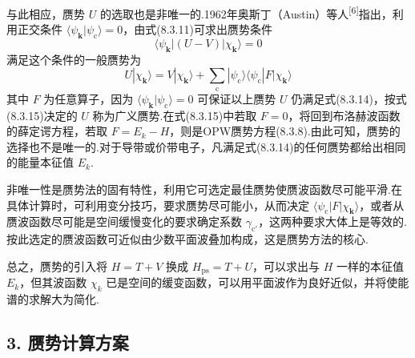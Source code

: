 与此相应，赝势 $U$ 的选取也是非唯一的.1962年奥斯丁（Austin）等人\textsuperscript{[6]}指出，利用正交条件 $\langle\psi_{\boldsymbol{k}}|\psi_{\mathrm{c}}\rangle=0$，由式(8.3.11)可求出赝势条件
\begin{equation}
  \langle\psi_{\boldsymbol{k}}|(U-V)|\chi_{\boldsymbol{k}}\rangle=0
\end{equation}
满足这个条件的一般赝势为
\begin{equation}
  U|\chi_{\boldsymbol{k}}\rangle=V|\chi_{\boldsymbol{k}}\rangle+\sum_{\mathrm{c}}|\psi_{\mathrm{c}}\rangle\langle\psi_{\mathrm{c}}|F|\chi_{\boldsymbol{k}}\rangle
\end{equation}
其中 $F$ 为任意算子，因为 $\langle\psi_{\boldsymbol{k}}|\psi_{\mathrm{c}}\rangle=0$ 可保证以上赝势 $U$ 仍满足式(8.3.14)，按式(8.3.15)决定的 $U$ 称为广义赝势.在式(8.3.15)中若取 $F=0$，将回到布洛赫波函数的薛定谔方程，若取 $F=E_{k}-H$，则是OPW赝势方程(8.3.8).由此可知，赝势的选择也不是唯一的.对于导带或价带电子，凡满足式(8.3.14)的任何赝势都给出相同的能量本征值 $E_{k}$.

非唯一性是赝势法的固有特性，利用它可选定最佳赝势使赝波函数尽可能平滑.在具体计算时，可利用变分技巧，要求赝势尽可能小，从而决定 $\langle\psi_{\mathrm{c}}|F|\chi_{\boldsymbol{k}}\rangle$，或者从赝波函数尽可能是空间缓慢变化的要求确定系数 $\gamma_{\mathrm{c}'}$，这两种要求大体上是等效的.按此选定的赝波函数可近似由少数平面波叠加构成，这是赝势方法的核心.

总之，赝势的引入将 $H=T+V$ 换成 $H_{\mathrm{ps}}=T+U$，可以求出与 $H$ 一样的本征值 $E_{k}$，但其波函数 $\chi_{k}$ 已是空间的缓变函数，可以用平面波作为良好近似，并将使能谱的求解大为简化.

\subsection*{3. 赝势计算方案}

